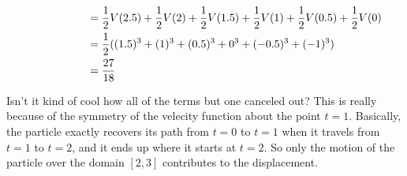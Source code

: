 \documentclass{ximera}
\begin{document}
\begin{question}
\begin{question}
\begin{hint}
\begin{align*}
        \end{align*}
      \end{hint}
      \begin{hint}
        \begin{align*}
          \hphantom{P(3) - P(0)} &= \frac{1}{2}V(2.5)+\frac{1}{2}V(2) +\frac{1}{2}V(1.5)+\frac{1}{2}V(1)+\frac{1}{2}V(0.5)+\frac{1}{2}V(0)\\
          &= \frac{1}{2} ( (1.5)^3+ (1)^3 + (0.5)^3+0^3+(-0.5)^3+(-1)^3 )\\
          &= \frac{27}{18}
        \end{align*}
        
        Isn't it kind of cool how all of the terms but one canceled out?  This is really because of the symmetry of the velecity function about the point $t=1$.  Basically, the particle exactly recovers its path from $t=0$ to $t=1$ when it travels from $t=1$ to $t=2$, and it ends up where it starts at $t=2$.  So only the motion of the particle over the domain $[2,3]$ contributes to the displacement.
      \end{hint}
    \end{question}
  \end{question}
\end{document}
